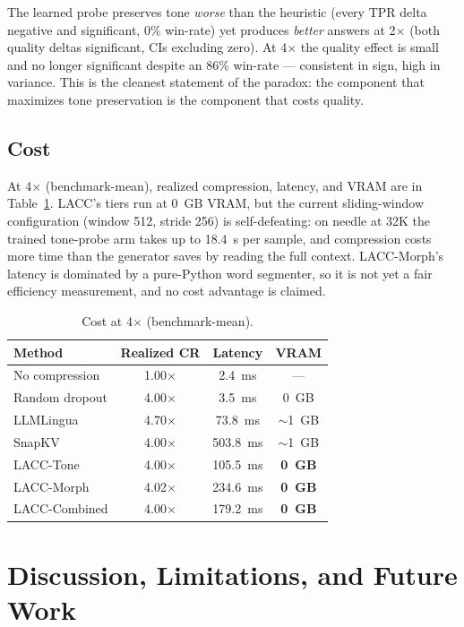 \documentclass[runningheads]{llncs}
\newcommand{\method}[1]{\textsc{#1}}
\begin{document}
The learned probe preserves tone \emph{worse} than the heuristic (every TPR delta negative and significant, 0\% win-rate) yet produces \emph{better} answers at 2$\times$ (both quality deltas significant, CIs excluding zero). At 4$\times$ the quality effect is small and no longer significant despite an 86\% win-rate --- consistent in sign, high in variance. This is the cleanest statement of the paradox: the component that maximizes tone preservation is the component that costs quality.

\subsection{Cost}

At 4$\times$ (benchmark-mean), realized compression, latency, and VRAM are in Table~\ref{tab:cost}. \method{LACC}'s tiers run at 0~GB VRAM, but the current sliding-window configuration (window 512, stride 256) is self-defeating: on needle at 32K the trained tone-probe arm takes up to 18.4~s per sample, and compression costs more time than the generator saves by reading the full context. LACC-Morph's latency is dominated by a pure-Python word segmenter, so it is not yet a fair efficiency measurement, and no cost advantage is claimed.

\begin{table}[H]
\centering
\caption{Cost at 4$\times$ (benchmark-mean).}
\label{tab:cost}
\begin{tabular}{lccc}
\toprule
\textbf{Method} & \textbf{Realized CR} & \textbf{Latency} & \textbf{VRAM} \\
\midrule
No compression & 1.00$\times$ & 2.4~ms & --- \\
Random dropout & 4.00$\times$ & 3.5~ms & 0~GB \\
LLMLingua & 4.70$\times$ & 73.8~ms & $\sim$1~GB \\
SnapKV & 4.00$\times$ & 503.8~ms & $\sim$1~GB \\
LACC-Tone & 4.00$\times$ & 105.5~ms & \textbf{0~GB} \\
LACC-Morph & 4.02$\times$ & 234.6~ms & \textbf{0~GB} \\
LACC-Combined & 4.00$\times$ & 179.2~ms & \textbf{0~GB} \\
\bottomrule
\end{tabular}
\end{table}


\section{Discussion, Limitations, and Future Work}
\end{document}
